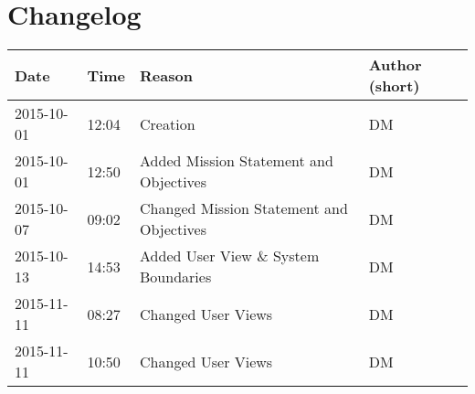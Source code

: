 \chapter{Changelog}

\begin{table}[h]
	\begin{tabularx}{\textwidth}{llll}
		Date & Time & Reason & Author (short)\\
		\toprule
		2015-10-01 & 12:04 & Creation & DM\\
		2015-10-01 & 12:50 & Added Mission Statement and Objectives & DM\\
		2015-10-07 & 09:02 & Changed Mission Statement and Objectives & DM\\
		2015-10-13 & 14:53 & Added User View \& System Boundaries & DM\\
		2015-11-11 & 08:27 & Changed User Views & DM\\
		2015-11-11 & 10:50 & Changed User Views & DM\\
	\end{tabularx}
\end{table}


